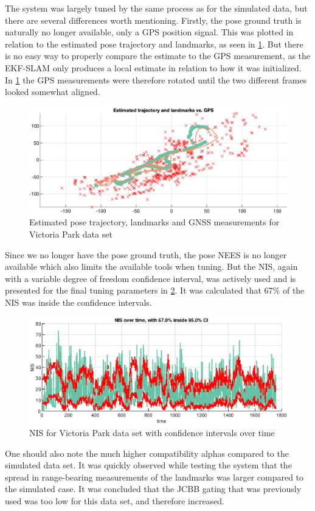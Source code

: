 The system was largely tuned by the same process as for the simulated data, but there are several differences worth mentioning. Firstly, the pose ground truth is naturally no longer available, only a GPS position signal. This was plotted in relation to the estimated pose trajectory and landmarks, as seen in \cref{fig:ga_3_real_trajectory}. But there is no easy way to properly compare the estimate to the GPS measurement, as the EKF-SLAM only produces a local estimate in relation to how it was initialized. In \cref{fig:ga_3_real_trajectory} the GPS measurements were therefore rotated until the two different frames looked somewhat aligned.

\begin{figure}[!htb]
    \centering
    \includegraphics[width=0.7\linewidth]{figures/ga_3/real_trajectory.eps}
    \caption{Estimated pose trajectory, landmarks and GNSS measurements for Victoria Park data set}
    \label{fig:ga_3_real_trajectory}
\end{figure}

Since we no longer have the pose ground truth, the pose NEES is no longer available which also limits the available tools when tuning. But the NIS, again with a variable degree of freedom confidence interval, was actively used and is presented for the final tuning parameters in \cref{fig:ga_3_real_NIS}. It was calculated that 67\% of the NIS was inside the confidence intervals.  

\begin{figure}[!htb]
    \centering
    \includegraphics[width=0.8\linewidth]{figures/ga_3/real_NIS.eps}
    \caption{NIS for Victoria Park data set with confidence intervals over time}
    \label{fig:ga_3_real_NIS}
\end{figure}

One should also note the much higher compatibility alphas compared to the simulated data set. It was quickly observed while testing the system that the spread in range-bearing measurements of the landmarks was larger compared to the simulated case. It was concluded that the JCBB gating that was previously used was too low for this data set, and therefore increased.

